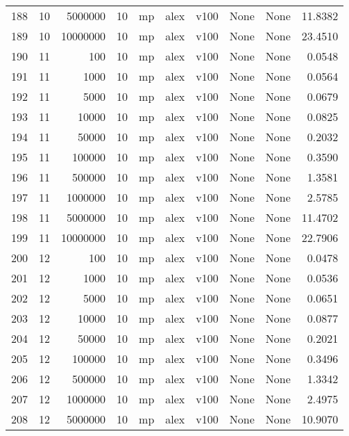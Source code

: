 \begin{tabular}{lrrrlllllr}
188 &  10 &   5000000 &      10 &   mp &  alex &  v100 &  None &  None &  11.8382 \\
189 &  10 &  10000000 &      10 &   mp &  alex &  v100 &  None &  None &  23.4510 \\
190 &  11 &       100 &      10 &   mp &  alex &  v100 &  None &  None &   0.0548 \\
191 &  11 &      1000 &      10 &   mp &  alex &  v100 &  None &  None &   0.0564 \\
192 &  11 &      5000 &      10 &   mp &  alex &  v100 &  None &  None &   0.0679 \\
193 &  11 &     10000 &      10 &   mp &  alex &  v100 &  None &  None &   0.0825 \\
194 &  11 &     50000 &      10 &   mp &  alex &  v100 &  None &  None &   0.2032 \\
195 &  11 &    100000 &      10 &   mp &  alex &  v100 &  None &  None &   0.3590 \\
196 &  11 &    500000 &      10 &   mp &  alex &  v100 &  None &  None &   1.3581 \\
197 &  11 &   1000000 &      10 &   mp &  alex &  v100 &  None &  None &   2.5785 \\
198 &  11 &   5000000 &      10 &   mp &  alex &  v100 &  None &  None &  11.4702 \\
199 &  11 &  10000000 &      10 &   mp &  alex &  v100 &  None &  None &  22.7906 \\
200 &  12 &       100 &      10 &   mp &  alex &  v100 &  None &  None &   0.0478 \\
201 &  12 &      1000 &      10 &   mp &  alex &  v100 &  None &  None &   0.0536 \\
202 &  12 &      5000 &      10 &   mp &  alex &  v100 &  None &  None &   0.0651 \\
203 &  12 &     10000 &      10 &   mp &  alex &  v100 &  None &  None &   0.0877 \\
204 &  12 &     50000 &      10 &   mp &  alex &  v100 &  None &  None &   0.2021 \\
205 &  12 &    100000 &      10 &   mp &  alex &  v100 &  None &  None &   0.3496 \\
206 &  12 &    500000 &      10 &   mp &  alex &  v100 &  None &  None &   1.3342 \\
207 &  12 &   1000000 &      10 &   mp &  alex &  v100 &  None &  None &   2.4975 \\
208 &  12 &   5000000 &      10 &   mp &  alex &  v100 &  None &  None &  10.9070 \\

\end{tabular}
